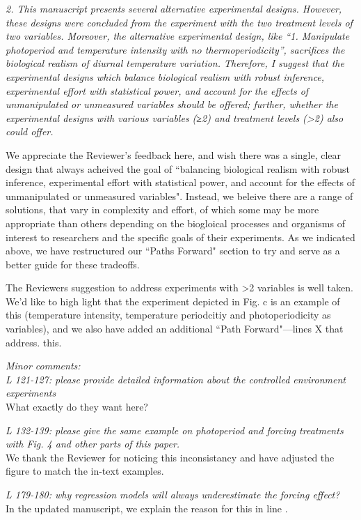\documentclass[11pt]{article}
\begin{document}
\emph{2. This manuscript presents several alternative experimental designs. However, these designs were concluded from the experiment with the two treatment levels of two variables. Moreover, the alternative experimental design, like “1. Manipulate photoperiod and temperature intensity with no thermoperiodicity”, sacrifices the biological realism of diurnal temperature variation. Therefore, I suggest that the experimental designs which balance biological realism with robust inference, experimental effort with statistical power, and account for the effects of unmanipulated or unmeasured variables should be offered; further, whether the experimental designs with various variables (≥2) and treatment levels (>2) also could offer.}

We appreciate the Reviewer's feedback here, and wish there was a single, clear design that always acheived the goal of ``balancing biological realism with robust inference, experimental effort with statistical power, and account for the effects of unmanipulated or unmeasured variables". Instead, we beleive there are a range of solutions, that vary in complexity and effort, of which some may be more appropriate than others depending on the biogloical processes and organisms of interest to researchers and the specific goals of their experiments. As we indicated above, we have restructured our ``Paths Forward" section to try and serve as a better guide for these tradeoffs.

The Reviewers suggestion to address experiments with >2 variables is well taken. We'd like to high light that the experiment depicted in Fig. \label{fig:designs}c is an example of this (temperature intensity, temperature periodcitiy and photoperiodicity as variables), and we also have added an additional ``Path Forward"---lines X that address. this.

\emph{Minor comments:}\\

\emph{L 121-127: please provide detailed information about the controlled environment experiments}\\
What exactly do they want here?

\emph{L 132-139: please give the same example on photoperiod and forcing treatments with Fig. 4 and other parts of this paper.}\\
We thank the Reviewer for noticing this inconsistancy and have adjusted the figure to match the in-text examples.


\emph{L 179-180: why regression models will always underestimate the forcing effect?}\\
In the updated manuscript, we explain the reason for this in line .
\end{document}
